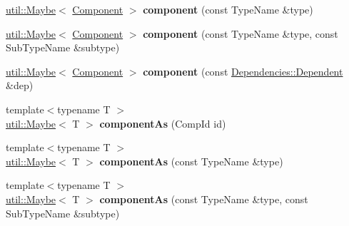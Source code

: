 \begin{DoxyCompactItemize}
\item 
\hypertarget{classtheoria_1_1core_1_1Registry_a7daaf0e52575c5dfbdb33c81953142f5}{\hyperlink{classtheoria_1_1util_1_1Maybe}{util\+::\+Maybe}$<$ \hyperlink{classtheoria_1_1core_1_1Component}{Component} $>$ {\bfseries component} (const Type\+Name \&type)}\label{classtheoria_1_1core_1_1Registry_a7daaf0e52575c5dfbdb33c81953142f5}

\item 
\hypertarget{classtheoria_1_1core_1_1Registry_a5a3cafd6ebd46a88fb5afb877a4b04ad}{\hyperlink{classtheoria_1_1util_1_1Maybe}{util\+::\+Maybe}$<$ \hyperlink{classtheoria_1_1core_1_1Component}{Component} $>$ {\bfseries component} (const Type\+Name \&type, const Sub\+Type\+Name \&subtype)}\label{classtheoria_1_1core_1_1Registry_a5a3cafd6ebd46a88fb5afb877a4b04ad}

\item 
\hypertarget{classtheoria_1_1core_1_1Registry_a535f463285f3232258573c4e8ae2d9f9}{\hyperlink{classtheoria_1_1util_1_1Maybe}{util\+::\+Maybe}$<$ \hyperlink{classtheoria_1_1core_1_1Component}{Component} $>$ {\bfseries component} (const \hyperlink{structtheoria_1_1core_1_1Dependencies_1_1Dependent}{Dependencies\+::\+Dependent} \&dep)}\label{classtheoria_1_1core_1_1Registry_a535f463285f3232258573c4e8ae2d9f9}

\item 
\hypertarget{classtheoria_1_1core_1_1Registry_aea2d62c83c04fddd8959bed80c556ca3}{{\footnotesize template$<$typename T $>$ }\\\hyperlink{classtheoria_1_1util_1_1Maybe}{util\+::\+Maybe}$<$ T $>$ {\bfseries component\+As} (Comp\+Id id)}\label{classtheoria_1_1core_1_1Registry_aea2d62c83c04fddd8959bed80c556ca3}

\item 
\hypertarget{classtheoria_1_1core_1_1Registry_a90b05bb2e88d6bed56173d74e4e96802}{{\footnotesize template$<$typename T $>$ }\\\hyperlink{classtheoria_1_1util_1_1Maybe}{util\+::\+Maybe}$<$ T $>$ {\bfseries component\+As} (const Type\+Name \&type)}\label{classtheoria_1_1core_1_1Registry_a90b05bb2e88d6bed56173d74e4e96802}

\item 
\hypertarget{classtheoria_1_1core_1_1Registry_a4140c9c7405974759ee43eb07a05a087}{{\footnotesize template$<$typename T $>$ }\\\hyperlink{classtheoria_1_1util_1_1Maybe}{util\+::\+Maybe}$<$ T $>$ {\bfseries component\+As} (const Type\+Name \&type, const Sub\+Type\+Name \&subtype)}\label{classtheoria_1_1core_1_1Registry_a4140c9c7405974759ee43eb07a05a087}


\end{DoxyCompactItemize}
